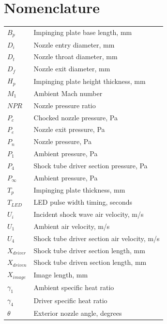 \section*{Nomenclature}
\begin{table}[H]
\begin{tabular}{ll} \smallskip
$B_p$      & Impinging plate base length, mm          \\ \smallskip
$D_i$      & Nozzle entry diameter, mm                   \\ \smallskip
$D_t$      & Nozzle throat diameter, mm                  \\ \smallskip
$D_f$      & Nozzle exit diameter, mm                    \\ \smallskip
$H_p$      & Impinging plate height thickness, mm          \\ \smallskip
$M_1$      & Ambient Mach number                         \\ \smallskip
$NPR$      & Nozzle pressure ratio                       \\ \smallskip
$P_c$      & Chocked nozzle pressure, Pa                        \\ \smallskip
$P_e$      & Nozzle exit pressure, Pa                        \\ \smallskip
$P_n$      & Nozzle pressure, Pa                        \\ \smallskip
$P_1$      & Ambient pressure, Pa                        \\ \smallskip
$P_4$      & Shock tube driver section pressure, Pa      \\ \smallskip
$P_{\infty}$   & Ambient pressure, Pa                        \\ \smallskip
$T_p$      & Impinging plate thickness, mm               \\ \smallskip
$T_{LED}$      & LED pulse width timing, seconds         \\ \smallskip
$U_i$      & Incident shock wave air velocity, m/s       \\ \smallskip
$U_1$      & Ambient air velocity, m/s                   \\ \smallskip
$U_4$      & Shock tube driver section air velocity, m/s \\ \smallskip
$X_{driver}$      & Shock tube driver section length, mm   \\ \smallskip
$X_{driven}$      & Shock tube driven section length, mm   \\ \smallskip
$X_{image}$      & Image length, mm                      \\ \smallskip
$\gamma_1$ & Ambient specific heat ratio                 \\ \smallskip
$\gamma_4$ & Driver specific heat ratio                  \\ \smallskip
$\theta$   & Exterior nozzle angle, degrees   
\end{tabular}
\end{table}
